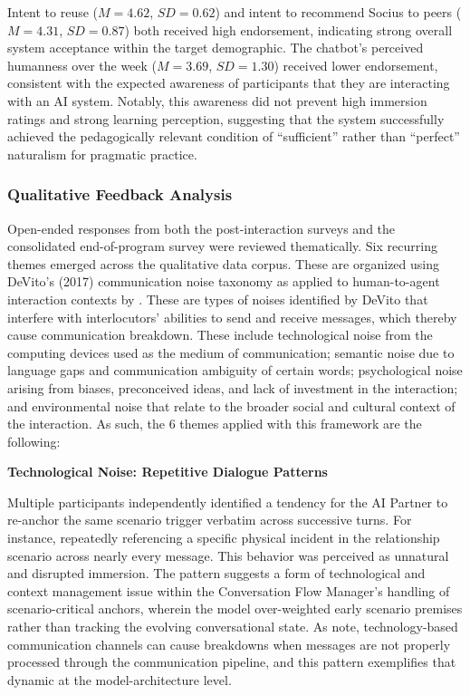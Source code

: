 Intent to reuse ($M = 4.62$, $SD = 0.62$) and intent to recommend Socius to peers ($M = 4.31$, $SD = 0.87$) both received high endorsement, indicating strong overall system acceptance within the target demographic. The chatbot's perceived humanness over the week ($M = 3.69$, $SD = 1.30$) received lower endorsement, consistent with the expected awareness of participants that they are interacting with an AI system. Notably, this awareness did not prevent high immersion ratings and strong learning perception, suggesting that the system successfully achieved the pedagogically relevant condition of ``sufficient'' rather than ``perfect'' naturalism for pragmatic practice.
 
\subsubsection{Qualitative Feedback Analysis}
 
Open-ended responses from both the post-interaction surveys and the consolidated end-of-program survey were 
reviewed thematically. Six recurring themes emerged across the qualitative data corpus. These are organized
using DeVito's (2017) communication noise taxonomy as applied to human-to-agent interaction contexts by . 
These are types of noises identified by DeVito that interfere with interlocutors' abilities to send and receive messages, which thereby cause communication
breakdown. These include technological noise from the computing devices used as the medium of communication; semantic noise due to language gaps and communication
ambiguity of certain words; psychological noise arising from biases, preconceived ideas, and lack of investment in the interaction; and environmental noise that relate
to the broader social and cultural context of the interaction. As such, the 6 themes applied with this framework are the following:
 
\noindent\textbf{Technological Noise: Repetitive Dialogue Patterns}

Multiple participants independently identified a tendency for the 
AI Partner to re-anchor the same scenario trigger verbatim across successive turns. For instance, repeatedly 
referencing a specific physical incident in the relationship scenario across nearly every message. This 
behavior was perceived as unnatural and disrupted immersion. The pattern suggests a form of technological and context management 
issue within the Conversation Flow Manager's handling of scenario-critical anchors, wherein the model 
over-weighted early scenario premises rather than tracking the evolving conversational state. As  note, 
technology-based communication channels can cause breakdowns when messages are 
not properly processed through the communication pipeline, and this pattern 
exemplifies that dynamic at the model-architecture level.


